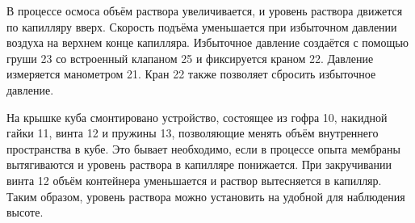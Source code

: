 В процессе осмоса объём раствора увеличивается, и уровень раствора движется по капилляру вверх. Скорость подъёма уменьшается при избыточном давлении воздуха на верхнем конце капилляра. Избыточное давление создаётся с помощью груши 23 со встроенный клапаном 25 и фиксируется краном 22. Давление измеряется манометром 21. Кран 22 также позволяет сбросить избыточное давление.

На крышке куба смонтировано устройство, состоящее из гофра 10, накидной гайки 11, винта 12 и пружины 13, позволяющие менять объём внутреннего пространства в кубе. Это бывает необходимо, если в процессе опыта мембраны вытягиваются и уровень раствора в капилляре понижается. При закручивании винта 12 объём контейнера уменьшается и раствор вытесняется в капилляр. Таким образом, уровень раствора можно установить на удобной для наблюдения высоте.



